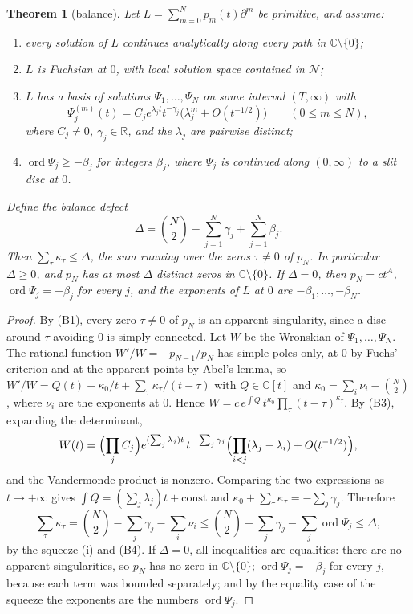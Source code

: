 \documentclass[11pt,a4paper]{article}
\newtheorem{theorem}{Theorem}[section]
\theoremstyle{definition}
\theoremstyle{remark}
\newcommand{\C}{\mathbb C}
\newcommand{\R}{\mathbb R}
\DeclareMathOperator{\ord}{ord}
\numberwithin{equation}{section}
\begin{document}
\begin{theorem}[balance]\label{V:thm:balance}
Let $L=\sum_{m=0}^{N}p_m(t)\partial^m$ be primitive, and assume:
\begin{enumerate}
\item[(B1)] every solution of $L$ continues analytically along every path in $\C\setminus\{0\}$;
\item[(B2)] $L$ is Fuchsian at $0$, with local solution space contained in $\mathcal N$;
\item[(B3)] $L$ has a basis of solutions $\Psi_1,\dots,\Psi_N$ on some interval $(T,\infty)$ with
\[
\Psi_j^{(m)}(t)=C_je^{\lambda_jt}t^{-\gamma_j}\bigl(\lambda_j^m+O(t^{-1/2})\bigr)\qquad(0\le m\le N),
\]
where $C_j\ne0$, $\gamma_j\in\R$, and the $\lambda_j$ are pairwise distinct;
\item[(B4)] $\ord\Psi_j\ge-\beta_j$ for integers $\beta_j$, where $\Psi_j$ is continued along $(0,\infty)$ to a slit disc at $0$.
\end{enumerate}
Define the \emph{balance defect}
\[
\Delta=\binom N2-\sum_{j=1}^{N}\gamma_j+\sum_{j=1}^{N}\beta_j .
\]
Then $\sum_{\tau}\kappa_\tau\le\Delta$, the sum running over the zeros $\tau\ne0$ of $p_N$. In particular $\Delta\ge0$, and $p_N$ has at most $\Delta$ distinct zeros in $\C\setminus\{0\}$. If $\Delta=0$, then $p_N=ct^A$, $\ord\Psi_j=-\beta_j$ for every $j$, and the exponents of $L$ at $0$ are $-\beta_1,\dots,-\beta_N$.
\end{theorem}

\begin{proof}
By (B1), every zero $\tau\ne0$ of $p_N$ is an apparent singularity, since a disc around $\tau$ avoiding $0$ is simply connected. Let $W$ be the Wronskian of $\Psi_1,\dots,\Psi_N$. The rational function $W'/W=-p_{N-1}/p_N$ has simple poles only, at $0$ by Fuchs' criterion and at the apparent points by Abel's lemma, so $W'/W=Q(t)+\kappa_0/t+\sum_\tau\kappa_\tau/(t-\tau)$ with $Q\in\C[t]$ and $\kappa_0=\sum_i\nu_i-\binom N2$, where $\nu_i$ are the exponents at $0$. Hence $W=c\,e^{\int Q}\,t^{\kappa_0}\prod_\tau(t-\tau)^{\kappa_\tau}$. By (B3), expanding the determinant,
\[
W(t)=\Bigl(\prod_jC_j\Bigr)e^{(\sum_j\lambda_j)t}\,t^{-\sum_j\gamma_j}\Bigl(\prod_{i<j}(\lambda_j-\lambda_i)+O(t^{-1/2})\Bigr),
\]
and the Vandermonde product is nonzero. Comparing the two expressions as $t\to+\infty$ gives $\int Q=(\sum_j\lambda_j)t+\mathrm{const}$ and $\kappa_0+\sum_\tau\kappa_\tau=-\sum_j\gamma_j$. Therefore
\[
\sum_\tau\kappa_\tau=\binom N2-\sum_j\gamma_j-\sum_i\nu_i\le\binom N2-\sum_j\gamma_j-\sum_j\ord\Psi_j\le\Delta,
\]
by the squeeze (i) and (B4). If $\Delta=0$, all inequalities are equalities: there are no apparent singularities, so $p_N$ has no zero in $\C\setminus\{0\}$; $\ord\Psi_j=-\beta_j$ for every $j$, because each term was bounded separately; and by the equality case of the squeeze the exponents are the numbers $\ord\Psi_j$.
\end{proof}
\end{document}
